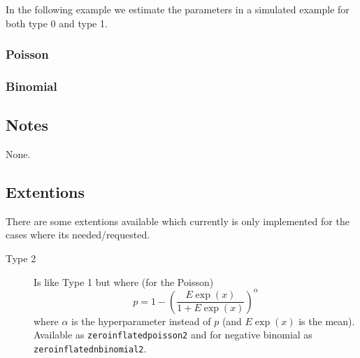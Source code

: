 \documentclass[a4paper,11pt]{article}
\begin{document}
In the following example we estimate the parameters in a simulated
example for both type 0 and type 1.
\subsubsection*{Poisson}



\subsubsection*{Binomial}



\subsection*{Notes}

None.

\subsection*{Extentions}

There are some extentions available which currently is only
implemented for the cases where its needed/requested.
\begin{description}
\item[Type 2] Is like Type 1 but where (for the Poisson)
    \begin{displaymath}
        p = 1-\left( \frac{E\exp(x)}{1 + E\exp(x)}\right)^{\alpha}
    \end{displaymath}
    where $\alpha$ is the hyperparameter instead of $p$ (and
    $E\exp(x)$ is the mean).  Available as
    \texttt{zeroinflatedpoisson2} and for negative binomial as
    \texttt{zeroinflatednbinomial2}.
\end{description}
\end{document}
